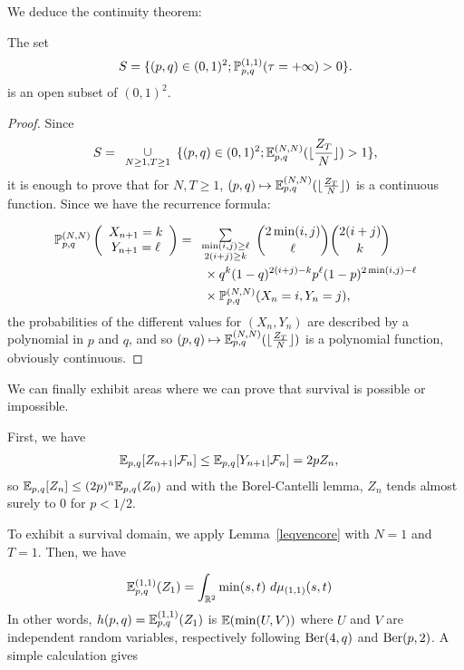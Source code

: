 We deduce the continuity theorem:
\begin{theo}
 The set 
 $$S=\{(p,q)\in(0,1)^2; \P^{(1,1)}_{p,q}(\tau=+\infty)>0\}.$$
 is an open subset of $(0,1)^2$.
\end{theo}

\begin{proof}
  Since $$S=\miniop{}{\cup}{N\ge 1,T\ge 1} \{(p,q)\in (0,1)^2; \E_{p,q}^{(N,N)}(\floor{\frac{Z_T}N})>1\},$$
  it is enough to prove that for $N,T\ge 1$, $(p,q)\mapsto \E_{p,q}^{(N,N)}(\floor{\frac{Z_T}N})$ is a continuous function.
  Since we have the recurrence formula:
  \begin{align*}
    \P^{(N,N)}_{p,q}\left(\begin{array}{c}X_{n+1}=k\\Y_{n+1}=\ell\end{array}\right)&=\miniop{}{\sum}{\substack{\min(i,j)\ge\ell \\ 2(i+j)\ge k}} \binom{2\min(i,j)}{\ell}\binom{2(i+j)}{k}\\ &\quad \quad\times q^k(1-q)^{2(i+j)-k}p^{\ell}(1-p)^{2\min(i,j)-\ell}\\ & \quad \quad\times \P^{(N,N)}_{p,q}(X_{n}=i,Y_{n}=j),
  \end{align*}
  the probabilities of the different values for $(X_n,Y_n)$ are described by a polynomial in $p$ and $q$, and so
   $(p,q)\mapsto \E_{p,q}^{(N,N)}(\floor{\frac{Z_T}N})$ is a polynomial function, obviously continuous.
  \end{proof}  
  
We can finally exhibit areas where we can prove that survival is possible or impossible.


First, we have
\begin{align*}
  \E_{p,q}[Z_{n+1}|\mathcal{F}_n]&\le \E_{p,q}[Y_{n+1}|\mathcal{F}_n]=2p Z_n,
\end{align*}
so $\E_{p,q}[Z_n]\le (2p)^n \E_{p,q}(Z_0)$ and with the Borel-Cantelli lemma,
$Z_n$ tends almost surely to $0$ for $p<1/2$.

To exhibit a survival domain, we apply Lemma~\ref{leqvencore} with $N=1$ and $T=1$. Then, we  have

\begin{align*}
  \E_{p,q}^{(1,1)}(Z_1)&=\int_{\R^2}\min(s,t) \ d\mu_{(1,1)}(s,t)
\end{align*}
In other words, $h(p,q)= \E_{p,q}^{(1,1)}(Z_1)$ is $\E(\min(U,V))$ where
$U$ and $V$ are independent random variables, respectively following
$\ber(4,q)$ and $\ber(p,2)$. A simple calculation gives

